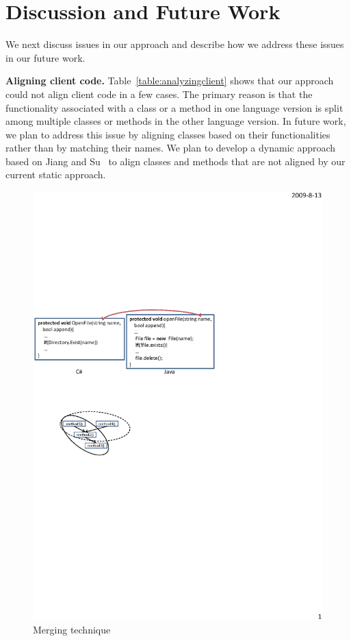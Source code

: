 \section{Discussion and Future Work}
\label{sec:discuss}

We next discuss issues in our approach and describe how we address
these issues in our future work.

\textbf{Aligning client code.} Table~\ref{table:analyzingclient} shows that our approach could not
align client code in a few cases. The primary reason is that
the functionality associated with a class or a method in one language
version is split among multiple classes or methods in the other language
version. In future work, we plan to address this issue by aligning
classes based on their functionalities rather than by matching their names.
We plan to develop a dynamic approach based on Jiang and Su~\cite{jiang2009automatic}
to align classes and methods that are not aligned by our current static approach.

\begin{figure}[t]
\centering
\includegraphics[scale=1,clip]{figure/n2n.eps}\vspace*{-3ex}
 \caption{Merging technique}\vspace*{-3.5ex}
 \label{fig:n2n}
\end{figure}

